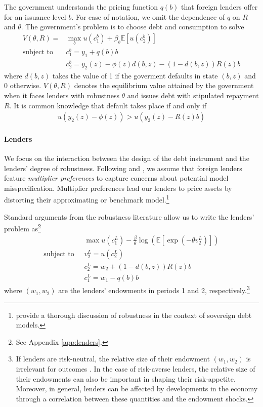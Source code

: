 The government understands the pricing function $q(b)$ that foreign lenders offer for an issuance level $b$. For ease of notation, we omit the dependence of $q$ on $R$ and $\theta$. The government's problem is to choose debt and consumption to solve
\begin{align*}
	V(\theta, R) = &\max_b u(c_1^b) + \beta_b \mathbb{E}\left[u(c_2^b) \right] \\
	\text{subject to }\;
	& c_1^b = y_1 + q(b) b \\
	& c_2^b = y_2(z) - \phi(z)d(b,z) - (1-d(b,z)) R(z) b
\end{align*}
where $d(b,z)$ takes the value of 1 if the goverment defaults in state $(b,z)$ and 0 otherwise. $V(\theta, R)$ denotes the equilibrium value attained by the government when it faces lenders with robustness $\theta$ and issues debt with stipulated repayment $R$. It is common knowledge that default takes place if and only if
\begin{align*}
	u\left(y_2(z) - \phi(z)\right) > u\left(y_2(z) - R(z) b\right)
\end{align*}

\paragraph{Lenders} We focus on the interaction between the design of the debt instrument and the lenders' degree of robustness. Following \citet{HansenSargent2001} and \citet{PouzoPresno2016}, we assume that foreign lenders feature \emph{multiplier preferences} to capture concerns about potential model misspecification. Multiplier preferences lead our lenders to price assets by distorting their approximating or benchmark model.\footnote{\citet{PouzoPresno2016} provide a thorough discussion of robustness in the context of sovereign debt models.}

Standard arguments from the robustness literature allow us to write the lenders' problem as\footnote{See Appendix \ref{app:lenders}.}
\begin{align*}
	&\max u(c_1^L) - \frac{\beta}{\theta} \log \left( \mathbb{E}\left[ \exp(-\theta v_2^L) \right] \right) \\
	\text{subject to }\;
	& v_2^L = u(c_2^L) \\
	& c_2^L = w_2 + (1-d(b,z)) R(z) b \\
	& c_1^L = w_1 - q(b) b
\end{align*}
where $(w_1, w_2)$ are the lenders' endowments in periods 1 and 2, respectively.\footnote{If lenders are risk-neutral, the relative size of their endowment $(w_1, w_2)$ is irrelevant for outcomes \citep[see][for a proof in the context of noncontingent debt]{PouzoPresno2016}. In the case of risk-averse lenders, the relative size of their endowments can also be important in shaping their risk-appetite. Moreover, in general, lenders can be affected by developments in the economy through a correlation between these quantities and the endowment shocks.}


